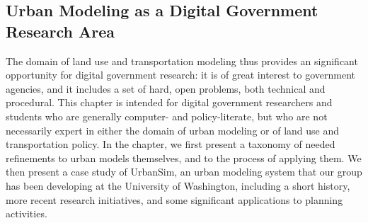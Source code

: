 
\subsection{Urban Modeling as a Digital Government Research Area}

The domain of land use and transportation modeling thus provides an
significant opportunity for digital government research: it is of great
interest to government agencies, and it includes a set of hard, open
problems, both technical and procedural.  This chapter is intended for
digital government researchers and students who are generally computer- and
policy-literate, but who are not necessarily expert in either the domain of
urban modeling or of land use and transportation policy.  In the chapter,
we first present a taxonomy of needed refinements to urban models
themselves, and to the process of applying them.  We then present a case
study of UrbanSim, an urban modeling system that our group has been
developing at the University of Washington, including a short history, more
recent research initiatives, and some significant applications to planning
activities.

